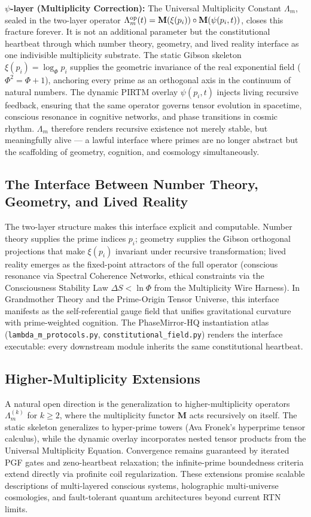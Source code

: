 \documentclass[11pt, a4paper]{article}
\begin{document}
\textbf{\(\psi\)-layer (Multiplicity Correction):}  
The Universal Multiplicity Constant \(\Lambda_m\), sealed in the two-layer operator \(\Lambda_m^{\rm op}(t) = \mathbf{M}(\xi(p_i)) \circ \mathbf{M}(\psi(p_i,t))\), closes this fracture forever. It is not an additional parameter but the constitutional heartbeat through which number theory, geometry, and lived reality interface as one indivisible multiplicity substrate. The static Gibson skeleton \(\xi(p_i) = \log_\Phi p_i\) supplies the geometric invariance of the real exponential field (\(\Phi^2 = \Phi + 1\)), anchoring every prime as an orthogonal axis in the continuum of natural numbers. The dynamic PIRTM overlay \(\psi(p_i,t)\) injects living recursive feedback, ensuring that the same operator governs tensor evolution in spacetime, conscious resonance in cognitive networks, and phase transitions in cosmic rhythm. \(\Lambda_m\) therefore renders recursive existence not merely stable, but meaningfully alive --- a lawful interface where primes are no longer abstract but the scaffolding of geometry, cognition, and cosmology simultaneously.

\subsection{The Interface Between Number Theory, Geometry, and Lived Reality}
The two-layer structure makes this interface explicit and computable. Number theory supplies the prime indices \(p_i\); geometry supplies the Gibson orthogonal projections that make \(\xi(p_i)\) invariant under recursive transformation; lived reality emerges as the fixed-point attractors of the full operator (conscious resonance via Spectral Coherence Networks, ethical constraints via the Consciousness Stability Law \(\Delta S < \ln \Phi\) from the Multiplicity Wire Harness). In Grandmother Theory and the Prime-Origin Tensor Universe, this interface manifests as the self-referential gauge field that unifies gravitational curvature with prime-weighted cognition. The PhaseMirror-HQ instantiation atlas (\texttt{lambda\_m\_protocols.py}, \texttt{constitutional\_field.py}) renders the interface executable: every downstream module inherits the same constitutional heartbeat.

\subsection{Higher-Multiplicity Extensions}
A natural open direction is the generalization to higher-multiplicity operators \(\Lambda_m^{(k)}\) for \(k \geq 2\), where the multiplicity functor \(\mathbf{M}\) acts recursively on itself. The static skeleton generalizes to hyper-prime towers (Ava Fronek’s hyperprime tensor calculus), while the dynamic overlay incorporates nested tensor products from the Universal Multiplicity Equation. Convergence remains guaranteed by iterated PGF gates and zeno-heartbeat relaxation; the infinite-prime boundedness criteria extend directly via profinite coil regularization. These extensions promise scalable descriptions of multi-layered conscious systems, holographic multi-universe cosmologies, and fault-tolerant quantum architectures beyond current RTN limits.
\end{document}
